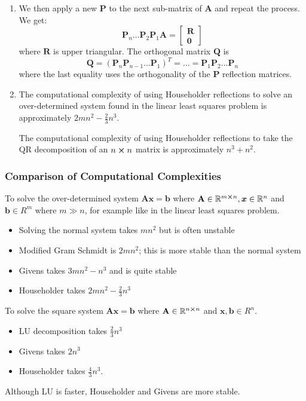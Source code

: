 \documentclass[11pt, a4paper]{article}
\newcommand{\R}{\mathbb{R}} %
\newcommand{\mat}[1]{\mathbf{#1}} %
\begin{document}
\begin{enumerate}
	\item We then apply a new $ \mat{P} $ to the next sub-matrix of $ \mat{A} $ and repeat the process. We get:
	\[
		\mat{P}_n \dots \mat{P}_2 \mat{P}_1 \mat{A} = 
		\begin{bmatrix}
			\mat{R}\\
			\mat{0}
		\end{bmatrix}
	\] 
	where $ \mat{R} $ is upper triangular. The orthogonal matrix $ \mat{Q} $ is
	\begin{equation*}
		\mat{Q} = (\mat{P}_{n} \mat{P}_{n-1} \dots \mat{P}_{1})^{T} = \dots = \mat{P}_{1} \mat{P}_{2} \dots \mat{P}_{n}
	\end{equation*}
	where the last equality uses the orthogonality of the $ \mat{P} $ reflection matrices.
	
	\item The computational complexity of using Householder reflections to solve an over-determined system found in the linear least squares problem is approximately $ 2mn^{2} - \frac{2}{3} n^{3} $.
	
	The computational complexity of using Householder reflections to take the QR decomposition of an $ n \cross n $ matrix is approximately $ n^{3} + n^{2} $.

	
	
\end{enumerate}

\subsubsection{Comparison of Computational Complexities}
To solve the over-determined system $ \mat{A} \bm{x} = \bm{b} $ where $ \mat{A} \in \R^{m \cross n}, \bm{x} \in \R^{n} $ and $ \bm{b} \in R^{m} $ where $ m \gg n $, for example like in the linear least squares problem.
\begin{itemize}
	\item Solving the normal system takes $ mn^{2} $ but is often unstable
	\item Modified Gram Schmidt is $ 2mn^{2} $; this is more stable than the normal system
	\item Givens takes $ 3mn^{2} - n^{3} $ and is quite stable
	\item Householder takes $ 2mn^{2} - \frac{2}{3} n^{3}  $
\end{itemize}
To solve the square system $ \mat{A} \bm{x} = \bm{b} $ where $ \mat{A} \in \R^{n \cross n} $ and $ \bm{x}, \bm{b} \in R^{n} $.
\begin{itemize}
	\item LU decomposition takes $ \frac{2}{3}n^{3} $
	\item Givens takes $ 2n^{3} $
	\item Householder takes $ \frac{4}{3}n^{3} $.
\end{itemize}
Although LU is faster, Householder and Givens are more stable.
\end{document}
